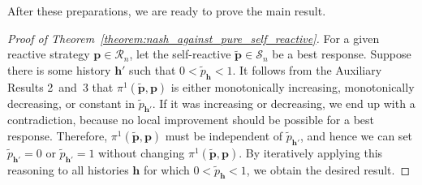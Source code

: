 \documentclass[11pt]{article}
\theoremstyle{plainCl1}
\theoremstyle{plainCl2}
\begin{document}
\noindent
After these preparations, we are ready to prove the main result. 

\begin{proof}[Proof of Theorem~\ref{theorem:nash_against_pure_self_reactive}]
For a given reactive strategy $\mathbf{p}\!\in\!\mathcal{R}_n$, let the self-reactive $\mathbf{\tilde p}\!\in\!\mathcal{S}_n$ be a best response. Suppose there is some history $\mathbf{h'}$ such that $0\!<\!\tilde p_\mathbf{h}\!<\!1$. It follows from the Auxiliary Results 2~and~3 that $\pi^1(\mathbf{\tilde p},\mathbf{p})$ is either monotonically increasing, monotonically decreasing, or constant in $\tilde p_\mathbf{h'}$. 
If it was increasing or decreasing, we end up with a contradiction, because no local improvement should be possible for a best response. 
Therefore, $\pi^1(\mathbf{\tilde p},\mathbf{p})$  must be independent of $\tilde p_\mathbf{h'}$, and hence we can set 
$\tilde p_\mathbf{h'}\!=\!0$ or $\tilde p_\mathbf{h'}\!=\!1$ without changing $\pi^1(\mathbf{\tilde p},\mathbf{p})$. By iteratively applying this reasoning to all histories $\mathbf{h}$ for which $0\!<\!\tilde p_\mathbf{h}\!<\!1$, we obtain the desired result. 
\end{proof}

\newpage



\end{document}

